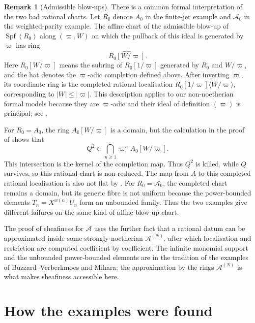 \documentclass[11pt,reqno]{amsart}
\theoremstyle{definition}
\newtheorem{remark}[remark]{Remark}
\begin{document}
\begin{remark}[Admissible blow-ups]\label{rem:second-example-relation}
There is a common formal interpretation of the two bad rational charts.  Let
$R_0$ denote $A_0$ in the finite-jet example and $\mathcal A_0$ in the
weighted-parity example.  The affine chart of the admissible blow-up of
$\operatorname{Spf}(R_0)$ along $(\varpi,W)$ on which the pullback of this
ideal is generated by $\varpi$ has ring
\[
  \widehat{R_0[W/\varpi]}.
\]
Here $R_0[W/\varpi]$ means the subring of $R_0[1/\varpi]$ generated by
$R_0$ and $W/\varpi$, and the hat denotes the $\varpi$-adic completion
defined above.  After inverting $\varpi$, its coordinate ring is the completed
rational localisation $R_0[1/\varpi]\langle W/\varpi\rangle$, corresponding
to $|W|\leq|\varpi|$.  This description applies to our non-noetherian formal
models because they are $\varpi$-adic and their ideal of definition
$(\varpi)$ is principal; see
\cite[Chapter~0, Section~7.1(c), and Chapter~II, Section~1.1(b)]{FK}.

For $R_0=A_0$, the ring $A_0[W/\varpi]$ is a domain, but the calculation in
the proof of  shows that
\[
  Q^2\in\bigcap_{n\geq1}\varpi^nA_0[W/\varpi].
\]
This intersection is the kernel of the completion map.  Thus $Q^2$ is killed,
while $Q$ survives, so this rational chart is non-reduced.  The map from $A$ to
this completed rational localisation is also not flat by
.  For $R_0=\mathcal A_0$, the completed
chart remains a domain, but its generic fibre is not uniform because the
power-bounded elements $T_n=X^{w(n)}U_n$ form an unbounded family.  Thus the two
examples give different failures on the same kind of affine blow-up chart.

The proof of sheafiness for $\mathcal A$ uses the further fact that a rational
datum can be approximated inside some strongly noetherian
$\mathcal A^{(N)}$, after which localisation and restriction are computed
coefficient by coefficient.  The infinite monomial support and the unbounded
power-bounded elements are in the tradition of the examples of
Buzzard--Verberkmoes and Mihara; the approximation by the rings
$\mathcal A^{(N)}$ is what makes sheafiness accessible here.
\end{remark}

\section{How the examples were found}\label{sec:discovery}
\end{document}
